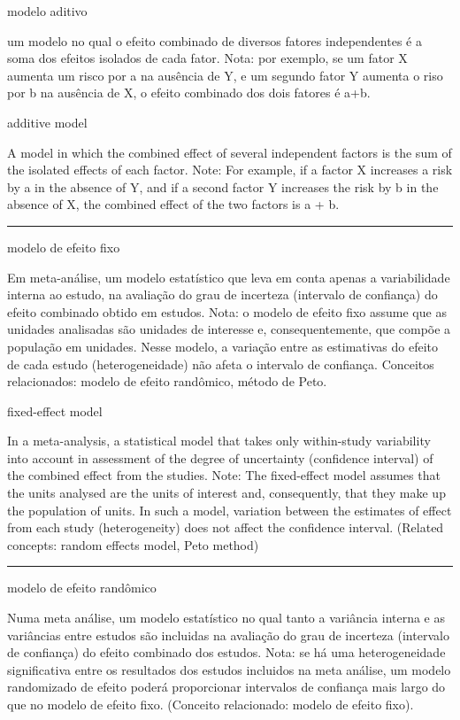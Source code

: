 \documentclass[
]{book}
\begin{document}
modelo aditivo

um modelo no qual o efeito combinado de diversos fatores independentes é a soma dos efeitos isolados de cada fator. Nota: por exemplo, se um fator X aumenta um risco por a na ausência de Y, e um segundo fator Y aumenta o riso por b na ausência de X, o efeito combinado dos dois fatores é a+b.

additive model

A model in which the combined effect of several independent factors is the sum of the isolated effects of each factor. Note: For example, if a factor X increases a risk by a in the absence of Y, and if a second factor Y increases the risk by b in the absence of X, the combined effect of the two factors is a + b.

\begin{center}\rule{0.5\linewidth}{0.5pt}\end{center}

modelo de efeito fixo

Em meta-análise, um modelo estatístico que leva em conta apenas a variabilidade interna ao estudo, na avaliação do grau de incerteza (intervalo de confiança) do efeito combinado obtido em estudos. Nota: o modelo de efeito fixo assume que as unidades analisadas são unidades de interesse e, consequentemente, que compõe a população em unidades. Nesse modelo, a variação entre as estimativas do efeito de cada estudo (heterogeneidade) não afeta o intervalo de confiança. Conceitos relacionados: modelo de efeito randômico, método de Peto.

fixed-effect model

In a meta-analysis, a statistical model that takes only within-study variability into account in assessment of the degree of uncertainty (confidence interval) of the combined effect from the studies. Note: The fixed-effect model assumes that the units analysed are the units of interest and, consequently, that they make up the population of units. In such a model, variation between the estimates of effect from each study (heterogeneity) does not affect the confidence interval. (Related concepts: random effects model, Peto method)

\begin{center}\rule{0.5\linewidth}{0.5pt}\end{center}

modelo de efeito randômico

Numa meta análise, um modelo estatístico no qual tanto a variância interna e as variâncias entre estudos são incluidas na avaliação do grau de incerteza (intervalo de confiança) do efeito combinado dos estudos. Nota: se há uma heterogeneidade significativa entre os resultados dos estudos incluidos na meta análise, um modelo randomizado de efeito poderá proporcionar intervalos de confiança mais largo do que no modelo de efeito fixo. (Conceito relacionado: modelo de efeito fixo).
\end{document}
